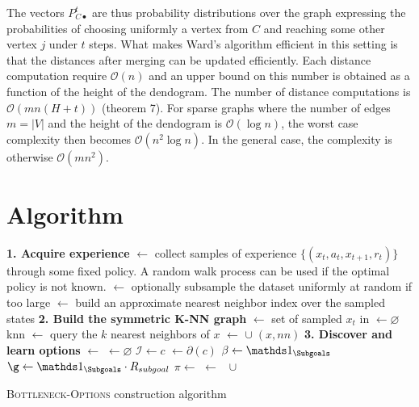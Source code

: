 The vectors $P^t_{C\bullet}$ are thus probability distributions over the graph expressing the probabilities of choosing uniformly a vertex from $C$ and reaching some other vertex $j$ under $t$ steps. What makes Ward's algorithm efficient in this setting is that the distances after merging can be updated efficiently. Each distance computation require $\mathcal{O}(n)$ and an upper bound on this number is obtained as a function of the height of the dendogram. The number of distance computations is $\mathcal{O}(mn(H + t))$ \cite{Pons2005} (theorem 7). For sparse graphs where the number of edges $m = |V|$ and the height of the dendogram is $\mathcal{O}(\log n)$, the worst case complexity then becomes $\mathcal{O}(n^2 \log n)$. In the general case, the complexity is otherwise $\mathcal{O}(mn^2)$. 

\section{Algorithm}
\begin{algorithm}
\DontPrintSemicolon
{}
\;

\textbf{1. Acquire experience} \;
\Dataset $\leftarrow$ collect samples of experience $\{(x_t, a_t, x_{t+1}, r_{t})\}$ through some fixed policy. A random walk process can be used if the optimal policy is not known. \;
\Dataset $\leftarrow$ optionally subsample the dataset uniformly at random if too large\;
\Index $\leftarrow$ build an approximate nearest neighbor index over the sampled states\;
\;
\textbf{2. Build the symmetric K-NN graph}\;
\Vertices $\leftarrow $ set of sampled $x_t$ in \Dataset \;
\Edges $\leftarrow \varnothing$\;
 {
knn $\leftarrow$ query the $k$ nearest neighbors of $x$\;
   {
     {
    \Edges $\leftarrow$ \Edges $\cup \; (x, nn)$
    }
  }
}
\;
\textbf{3. Discover and learn options} \;
\Communities $\leftarrow$  \;
\Options $\leftarrow \varnothing$ \;
 {
  $\mathcal{I} \leftarrow c$\;
  \Subgoals $\leftarrow \partial(c)$\;
  $\beta \leftarrow \indicator_{\Subgoals}$ \;
   $\g \leftarrow \indicator_{\Subgoals}\cdot R_{subgoal}$\;
   $\pi \leftarrow$ \LearnMDP{\g} \;
   \Options $\leftarrow$ \Options $\; \cup \;$  \;
}
\Return \Options
\caption{\textsc{Bottleneck-Options} construction algorithm}
\label{alg:knnoptions}
\end{algorithm}

